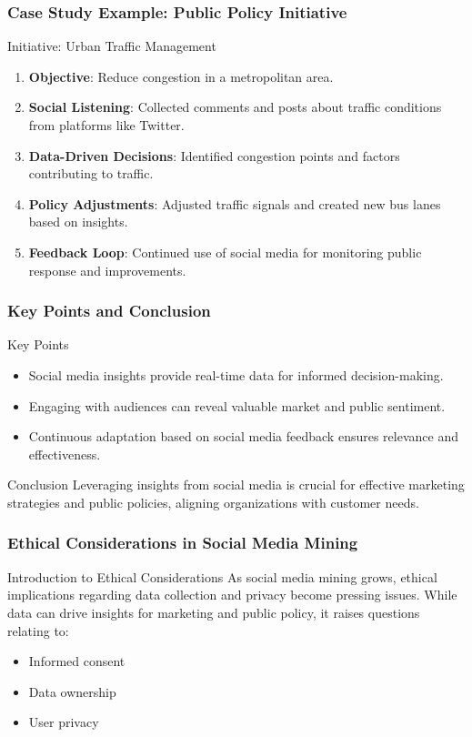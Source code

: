 \documentclass{beamer}
\begin{document}
\begin{frame}[fragile]
    \frametitle{Case Study Example: Public Policy Initiative}
    \begin{block}{Initiative: Urban Traffic Management}
        \begin{enumerate}
            \item \textbf{Objective}: Reduce congestion in a metropolitan area.
            \item \textbf{Social Listening}: Collected comments and posts about traffic conditions from platforms like Twitter.
            \item \textbf{Data-Driven Decisions}: Identified congestion points and factors contributing to traffic.
            \item \textbf{Policy Adjustments}: Adjusted traffic signals and created new bus lanes based on insights.
            \item \textbf{Feedback Loop}: Continued use of social media for monitoring public response and improvements.
        \end{enumerate}
    \end{block}
\end{frame}

\begin{frame}[fragile]
    \frametitle{Key Points and Conclusion}
    \begin{block}{Key Points}
        \begin{itemize}
            \item Social media insights provide real-time data for informed decision-making.
            \item Engaging with audiences can reveal valuable market and public sentiment.
            \item Continuous adaptation based on social media feedback ensures relevance and effectiveness.
        \end{itemize}
    \end{block}
    \begin{block}{Conclusion}
        Leveraging insights from social media is crucial for effective marketing strategies and public policies, aligning organizations with customer needs.
    \end{block}
\end{frame}

\begin{frame}[fragile]
    \frametitle{Ethical Considerations in Social Media Mining}
    \begin{block}{Introduction to Ethical Considerations}
        As social media mining grows, ethical implications regarding data collection and privacy become pressing issues. 
        While data can drive insights for marketing and public policy, it raises questions relating to:
        \begin{itemize}
            \item Informed consent
            \item Data ownership
            \item User privacy
        \end{itemize}
    \end{block}
\end{frame}
\end{document}
